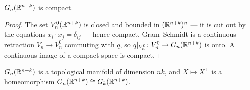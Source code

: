 \begin{proposition}
$G_n(\mathbb{R}^{n+k})$ is compact.
\end{proposition}

\begin{proof}
The set $V_n^0(\mathbb{R}^{n+k})$ is closed and bounded in $(\mathbb{R}^{n+k})^n$ --- it is cut
out by the equations $x_i\cdot x_j=\delta_{ij}$ --- hence compact. Gram--Schmidt
is a continuous retraction $V_n\to V_n^0$ commuting with $q$, so
$q|_{V_n^0}\colon V_n^0\to G_n(\mathbb{R}^{n+k})$ is onto. A continuous image of a
compact space is compact.
\end{proof}

\begin{theorem}\label{thm:grassmannian-manifold}
$G_n(\mathbb{R}^{n+k})$ is a topological manifold of dimension $nk$, and
$X\mapsto X^\perp$ is a homeomorphism
$G_n(\mathbb{R}^{n+k})\cong G_k(\mathbb{R}^{n+k})$.
\end{theorem}

